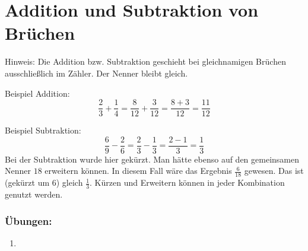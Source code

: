 	\section{Addition und Subtraktion von Brüchen}\vspace{-1em}

Hinweis: Die Addition bzw. Subtraktion geschieht bei gleichnamigen Brüchen ausschließlich im Zähler. Der Nenner bleibt gleich.

Beispiel Addition:
\begin{equation*}
	\frac{2}{3}+\frac{1}{4}= \frac{8}{12}+\frac{3}{12}= \frac{8+3}{12}=\frac{11}{12}
\end{equation*}

Beispiel Subtraktion:
\begin{equation*}
	\frac{6}{9}-\frac{2}{6}= \frac{2}{3}-\frac{1}{3}= \frac{2-1}{3}=\frac{1}{3}
\end{equation*}
Bei der Subtraktion wurde hier gekürzt. Man hätte ebenso auf den gemeinsamen Nenner $18$ erweitern können. In diesem Fall wäre das Ergebnis $\frac{6}{18}$ gewesen. Das ist (gekürzt um $6$) gleich $\frac{1}{3}$. Kürzen und Erweitern können in jeder Kombination genutzt werden.

\subsubsection*{Übungen:}\vspace{-1em}
\begin{enumerate}[label=\alph*)]
	\item {}
\end{enumerate}